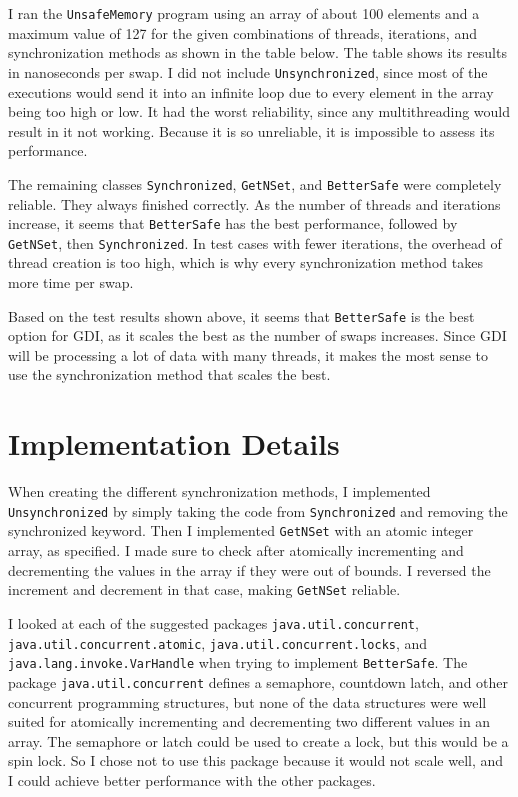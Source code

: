 \documentclass[letterpaper,twocolumn,10pt]{article}
\begin{document}
I ran the \texttt{UnsafeMemory} program using an array of about 100 elements and a maximum value
of 127 for the given combinations of threads, iterations, and synchronization methods as shown in the
table below. The table shows its results in nanoseconds per swap. I did not include \texttt{Unsynchronized},
since most of the executions would send it into an infinite loop due to every element in the array being too high or low.
It had the worst reliability, since any multithreading would result in it not working. Because it is so unreliable, it is
impossible to assess its performance.

The remaining classes \texttt{Synchronized}, \texttt{GetNSet}, and \texttt{BetterSafe} were completely reliable. They always
finished correctly. As the number of threads and iterations increase, it seems that \texttt{BetterSafe} has the best performance,
followed by \texttt{GetNSet}, then \texttt{Synchronized}. In test cases with fewer iterations, the overhead of thread creation is too high,
which is why every synchronization method takes more time per swap.

Based on the test results shown above, it seems that \texttt{BetterSafe} is the best option for GDI, as it scales the best as the number of swaps
increases. Since GDI will be processing a lot of data with many threads, it makes the most sense to use the synchronization method that scales the best.

\section{Implementation Details}

When creating the different synchronization methods, I implemented \texttt{Unsynchronized} by simply taking the code from \texttt{Synchronized} and removing
the synchronized keyword. Then I implemented \texttt{GetNSet} with an atomic integer array, as specified. I made sure to check after atomically incrementing and decrementing
the values in the array if they were out of bounds. I reversed the increment and decrement in that case, making \texttt{GetNSet} reliable.

I looked at each of the suggested packages \texttt{java.util.concurrent}, \texttt{java.util.concurrent.atomic}, \texttt{java.util.concurrent.locks}, and
\texttt{java.lang.invoke.VarHandle} when trying to implement \texttt{BetterSafe}. The package \texttt{java.util.concurrent} defines a semaphore, countdown latch, and other
concurrent programming structures, but none of the data structures were well suited for atomically incrementing and decrementing two different values in an array. The
semaphore or latch could be used to create a lock, but this would be a spin lock. So I chose not to use this package because it would not scale well, and I could achieve better
performance with the other packages.
\end{document}
